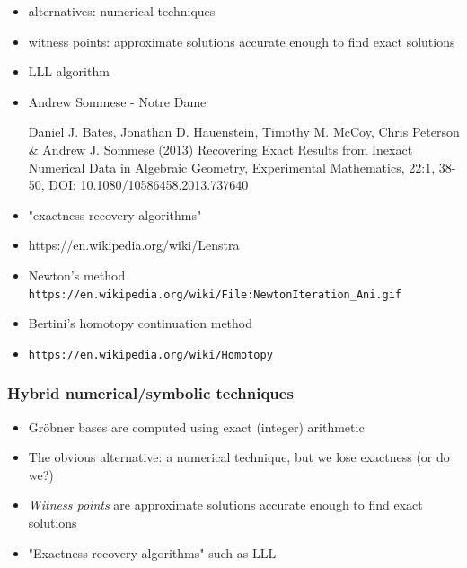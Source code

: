\documentclass{beamer}
\begin{document}
\begin{frame}
\begin{itemize}
\item alternatives: numerical techniques
\item witness points: approximate solutions accurate enough to find exact solutions
\item LLL algorithm

\item Andrew Sommese - Notre Dame

Daniel J. Bates, Jonathan D. Hauenstein, Timothy M. McCoy, Chris Peterson \& Andrew J. Sommese (2013)
Recovering Exact Results from Inexact Numerical Data in Algebraic Geometry,
Experimental Mathematics, 22:1, 38-50, DOI: 10.1080/10586458.2013.737640

\item "exactness recovery algorithms"
\item https://en.wikipedia.org/wiki/Lenstra%

\item Newton's method
     {\tt https://en.wikipedia.org/wiki/File:NewtonIteration\_Ani.gif}

\item Bertini's homotopy continuation method
\item {\tt https://en.wikipedia.org/wiki/Homotopy}
\end{itemize}
\end{frame}

\begin{frame}
\frametitle{Hybrid numerical/symbolic techniques}
\begin{itemize}
\item Gr\"obner bases are computed using exact (integer) arithmetic
\item The obvious alternative: a numerical technique, but we lose exactness (or do we?)
\item {\it Witness points} are approximate solutions accurate enough to find exact solutions
\item "Exactness recovery algorithms" such as LLL
\end{itemize}

\end{frame}
\end{document}
